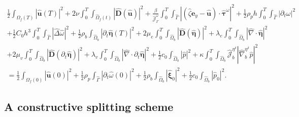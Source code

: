 \documentclass[11pt]{article}
\newcommand{\bd}{\boldsymbol}
\theoremstyle{definition}
\begin{document}
\begin{multline*}
\frac{1}{2} \int_{\Omega_{f}(T)} |\hat{\bd{u}}(T)|^{2} + 2\nu \int_{0}^{T} \int_{\hat{\Omega}_{f}(t)} |\hat{\bd{D}}(\hat{\bd{u}})|^{2} + \frac{\beta}{\hat{\mathcal{J}}^{\omega}_{\Gamma}} \int_{0}^{T} \int_{\hat{\Gamma}} |(\hat{\zeta} \bd{e}_{y} - \hat{\bd{u}}) \cdot \hat{\bd{\tau}}^{\omega}|^{2} + \frac{1}{2}\rho_{p} h \int_{0}^{T} \int_{\hat{\Gamma}} |\partial_{t}\omega|^{2} \\
+ \frac{1}{2}C_{0}h^{3} \int_{0}^{T} \int_{\hat{\Gamma}} |\hat{\Delta} \hat{\omega}|^{2} + \frac{1}{2}\rho_{b} \int_{\hat{\Omega}_{b}} |\partial_{t}\hat{\bd{\eta}}(T)|^{2} + 2\mu_{e} \int_{0}^{T} \int_{\hat{\Omega}_{b}} |\hat{\bd{D}}(\hat{\bd{\eta}})|^{2} + \lambda_{e} \int_{0}^{T} \int_{\hat{\Omega}_{b}} |\hat{\nabla} \cdot \hat{\bd{\eta}}|^{2} \\
+ 2\mu_{v} \int_{0}^{T} \int_{\hat{\Omega}_{b}} |\hat{\bd{D}}(\partial_{t}\hat{\bd{\eta}})|^{2} + \lambda_{v} \int_{0}^{T} \int_{\hat{\Omega}_{b}} |\hat{\nabla} \cdot \partial_{t}\hat{\bd{\eta}}|^{2} + \frac{1}{2}c_{0} \int_{\hat{\Omega}_{b}} |\hat{p}|^{2} + \kappa \int_{0}^{T} \int_{\hat{\Omega}_{b}} \hat{\mathcal{J}}^{\eta^{\delta}}_{b} |\hat{\nabla}^{\eta^{\delta}}_{b} \hat{p}|^{2} \\
= \frac{1}{2} \int_{\Omega_{f}(0)} |\hat{\bd{u}}(0)|^{2} + \frac{1}{2} \rho_{p} \int_{\hat{\Gamma}} |\partial_{t}\hat{\omega}(0)|^{2} + \frac{1}{2} \rho_{b} \int_{\hat{\Omega}_{b}} |\hat{\bd{\xi}}_{0}|^{2} + \frac{1}{2} c_{0} \int_{\hat{\Omega}_{b}} |\hat{p}_0|^{2}. 
\end{multline*}
\fi

\subsection{A constructive splitting scheme}
\end{document}
